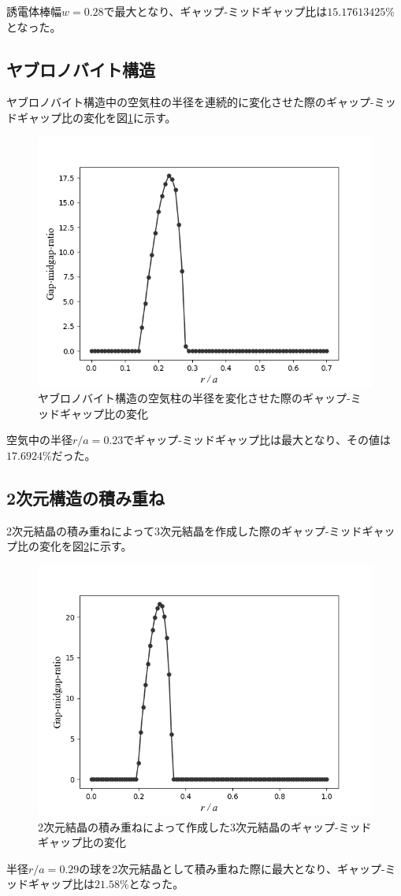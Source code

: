 \documentclass[platex,dvipdfmx]{jsreport}
\numberwithin{equation}{section}
\begin{document}
誘電体棒幅$w = 0.28$で最大となり、ギャップ-ミッドギャップ比は$15.17613425 \%$となった。

\subsection{ヤブロノバイト構造}
ヤブロノバイト構造中の空気柱の半径を連続的に変化させた際のギャップ-ミッドギャップ比の変化を図\ref{fig:yablonovite}に示す。
\begin{figure}[htbp]
  \centering
  \includegraphics[width=0.6\linewidth]{results/yablonovite.png}
  \caption{ヤブロノバイト構造の空気柱の半径を変化させた際のギャップ-ミッドギャップ比の変化}
  \label{fig:yablonovite}
\end{figure}

空気中の半径$r / a = 0.23$でギャップ-ミッドギャップ比は最大となり、その値は$17.6924 \%$だった。

\subsection{2次元構造の積み重ね}
2次元結晶の積み重ねによって3次元結晶を作成した際のギャップ-ミッドギャップ比の変化を図\ref{fig:stack-crystals}に示す。
\begin{figure}[htbp]
  \centering
  \includegraphics[width=0.6\linewidth]{results/stack-crystals.png}
  \caption{2次元結晶の積み重ねによって作成した3次元結晶のギャップ-ミッドギャップ比の変化}
  \label{fig:stack-crystals}
\end{figure}
半径$r / a = 0.29$の球を2次元結晶として積み重ねた際に最大となり、ギャップ-ミッドギャップ比は$21.58 \%$となった。
\end{document}
